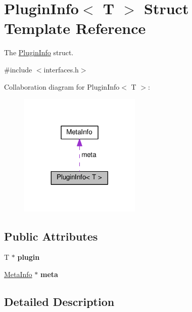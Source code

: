 \hypertarget{struct_plugin_info}{}\section{Plugin\+Info$<$ T $>$ Struct Template Reference}
\label{struct_plugin_info}


The \hyperlink{struct_plugin_info}{Plugin\+Info} struct.  




{\ttfamily \#include $<$interfaces.\+h$>$}



Collaboration diagram for Plugin\+Info$<$ T $>$\+:\nopagebreak
\begin{figure}[H]
\begin{center}
\leavevmode
\includegraphics[width=164pt]{struct_plugin_info__coll__graph}
\end{center}
\end{figure}
\subsection*{Public Attributes}
\begin{DoxyCompactItemize}
\item 
T $\ast$ {\bfseries plugin}\hypertarget{struct_plugin_info_a988245c24cc2fe6da1c0312b8835f803}{}\label{struct_plugin_info_a988245c24cc2fe6da1c0312b8835f803}

\item 
\hyperlink{struct_meta_info}{Meta\+Info} $\ast$ {\bfseries meta}\hypertarget{struct_plugin_info_a1f5e1a17fa1569bbdb2cc4bdcd7a5656}{}\label{struct_plugin_info_a1f5e1a17fa1569bbdb2cc4bdcd7a5656}

\end{DoxyCompactItemize}


\subsection{Detailed Description}
